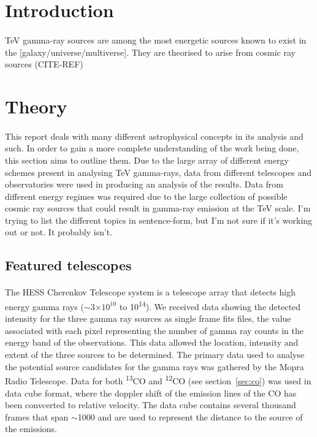 \documentclass[a4paper, titlepage, oneside]{article}
\newcommand{\elem}[2]{\textsuperscript{#1}{#2}}
\newcommand{\e}[1]{\ensuremath{\times 10^{#1}}}
\begin{document}
\begin{multicols}{2}
\section{Introduction} %
\paragraph{}
TeV gamma-ray sources are among the most energetic sources known to exist in the [galaxy/universe/multiverse]. They are theorised to arise from cosmic ray sources (CITE-REF)

\section{Theory} %
\paragraph{}
This report deals with many different astrophysical concepts in its analysis and such. In order to gain a more complete understanding of the work being done, this section aims to outline them. Due to the large array of different energy schemes present in analysing TeV gamma-rays, data from different telescopes and observatories were used in producing an analysis of the results. Data from different energy regimes was required due to the large collection of possible cosmic ray sources that could result in gamma-ray emission at the TeV scale. I'm trying to list the different topics in sentence-form, but I'm not sure if it's working out or not. It probably isn't.

\subsection{Featured telescopes}
\paragraph{}
The HESS Cherenkov Telescope system is a telescope array that detects high energy gamma rays (\(\sim\)\(3\e{10}\) to \unit{10^{14}}{\electronvolt}). We received data showing the detected intensity for the three gamma ray sources as single frame fits files, the value associated with each pixel representing the number of gamma ray counts in the energy band of the observations. This data allowed the location, intensity and extent of the three sources to be determined. The primary data used to analyse the potential source candidates for the gamma rays was gathered by the Mopra Radio Telescope. Data for both \elem{13}{C}O and \elem{12}{C}O (see section~\ref{sec:co}) was used in data cube format, where the doppler shift of the emission lines of the CO has been convcerted to relative velocity. The data cube contains several thousand frames that span \(\sim\)\unit{1000}{\kilo\meter\cdot\reciprocal\second} and are used to represent the distance to the source of the emissions.


\end{multicols}
\end{document}
